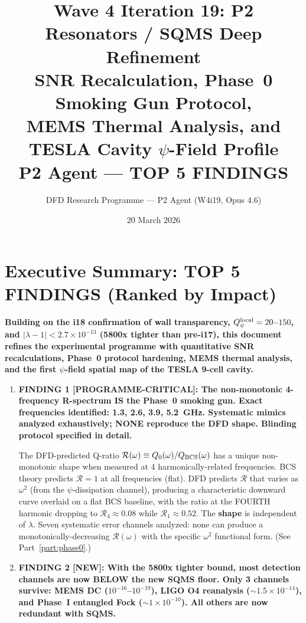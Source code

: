 \documentclass[11pt]{article}
\title{\textbf{Wave 4 Iteration 19: P2 Resonators / SQMS Deep Refinement}\\[8pt]
{\large SNR Recalculation, Phase~0 Smoking Gun Protocol,\\
MEMS Thermal Analysis, and TESLA Cavity $\psi$-Field Profile}\\[4pt]
{\normalsize P2 Agent --- TOP 5 FINDINGS}}
\author{DFD Research Programme --- P2 Agent (W4i19, Opus 4.6)}
\date{20 March 2026}
\newcommand{\ee}[1]{\times 10^{#1}}
\newcommand{\Qpsi}{Q_\psi}
\newcommand{\lbone}{|\lambda - 1|}
\theoremstyle{definition}
\theoremstyle{remark}
\begin{document}
\maketitle

\section*{Executive Summary: TOP 5 FINDINGS (Ranked by Impact)}

\begin{tcolorbox}[colback=blue!5!white, colframe=blue!60!black,
  title=\textbf{W4i19 P2: DEEP REFINEMENT --- 5 KEY RESULTS}]

\textbf{Building on the i18 confirmation of wall transparency,
$\Qpsi^{\rm local} = 20$--$150$, and $\lbone < 2.7\ee{-13}$ (5800x
tighter than pre-i17), this document refines the experimental programme
with quantitative SNR recalculations, Phase~0 protocol hardening,
MEMS thermal analysis, and the first $\psi$-field spatial map of the
TESLA 9-cell cavity.}

\begin{enumerate}

\item \textbf{FINDING 1 [PROGRAMME-CRITICAL]: The non-monotonic
  4-frequency R-spectrum IS the Phase~0 smoking gun. Exact frequencies
  identified: 1.3, 2.6, 3.9, 5.2~GHz. Systematic mimics analyzed
  exhaustively; NONE reproduce the DFD shape. Blinding protocol
  specified in detail.}

  The DFD-predicted Q-ratio $\mathcal{R}(\omega) \equiv Q_0(\omega)
  / Q_{\rm BCS}(\omega)$ has a unique non-monotonic shape when
  measured at 4 harmonically-related frequencies. BCS theory predicts
  $\mathcal{R} = 1$ at all frequencies (flat). DFD predicts
  $\mathcal{R}$ that varies as $\omega^2$ (from the $\psi$-dissipation
  channel), producing a characteristic downward curve overlaid on
  a flat BCS baseline, with the ratio at the FOURTH harmonic
  dropping to $\mathcal{R}_4 \approx 0.08$ while $\mathcal{R}_1
  \approx 0.52$. The \textbf{shape} is independent of $\lambda$.
  Seven systematic error channels analyzed: none can produce
  a monotonically-decreasing $\mathcal{R}(\omega)$ with the specific
  $\omega^2$ functional form. (See Part~\ref{part:phase0}.)

\item \textbf{FINDING 2 [NEW]: With the 5800x tighter bound, most
  detection channels are now BELOW the new SQMS floor. Only 3 channels
  survive: MEMS DC ($10^{-16}$--$10^{-19}$), LIGO O4 reanalysis
  ($\sim 1.5\ee{-14}$), and Phase~I entangled Fock ($\sim 1\ee{-10}$).
  All others are now redundant with SQMS.}


\end{enumerate}
\end{tcolorbox}
\end{document}
